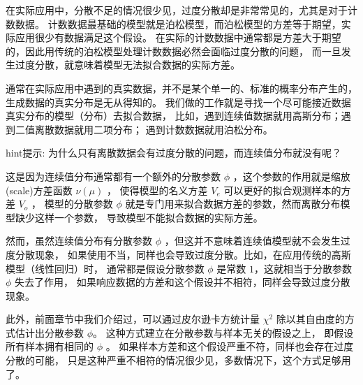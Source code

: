 \documentclass[letterpaper,10pt,english]{sphinxmanual}
\begin{document}
在实际应用中，分散不足的情况很少见，过度分散却是非常常见的，尤其是对于计数数据。
计数数据最基础的模型就是泊松模型，而泊松模型的方差等于期望，实际应用很少有数据满足这个假设。
在实际的计数数据中通常都是方差大于期望的，因此用传统的泊松模型处理计数数据必然会面临过度分散的问题，
而一旦发生过度分散，就意味着模型无法拟合数据的实际方差。

通常在实际应用中遇到的真实数据，并不是某个单一的、标准的概率分布产生的，生成数据的真实分布是无从得知的。
我们做的工作就是寻找一个尽可能接近数据真实分布的模型（分布）去拟合数据，
比如，遇到连续值数据就用高斯分布；遇到二值离散数据就用二项分布；
遇到计数数据就用泊松分布。

\begin{sphinxadmonition}{hint}{提示:}
为什么只有离散数据会有过度分散的问题，而连续值分布就没有呢？

这是因为连续值分布通常都有一个额外的分散参数 \(\phi\)
，这个参数的作用就是缩放(scale)方差函数 \(\nu(\mu)\) ，
使得模型的名义方差 \(V_e\) 可以更好的拟合观测样本的方差 \(V_{o}\) ，
模型的分散参数 \(\phi\) 就是专门用来拟合数据方差的参数，然而离散分布模型缺少这样一个参数，
导致模型不能拟合数据的实际方差。

然而，虽然连续值分布有分散参数 \(\phi\) ，但这并不意味着连续值模型就不会发生过度分散现象，
如果使用不当，同样也会导致过度分散。比如，在应用传统的高斯模型（线性回归）时，
通常都是假设分散参数 \(\phi\) 是常数 \(1\)，这就相当于分散参数 \(\phi\) 失去了作用，
如果响应数据的方差和这个假设并不相符，同样会导致过度分散现象。

此外，前面章节中我们介绍过，可以通过皮尔逊卡方统计量 \(\chi^2\) 除以其自由度的方式估计出分散参数 \(\phi\)。
这种方式建立在分散参数与样本无关的假设之上，
即假设所有样本拥有相同的 \(\phi\) 。
如果样本方差和这个假设严重不符，同样也会存在过度分散的可能，
只是这种严重不相符的情况很少见，多数情况下，这个方式足够用了。
\end{sphinxadmonition}
\end{document}
